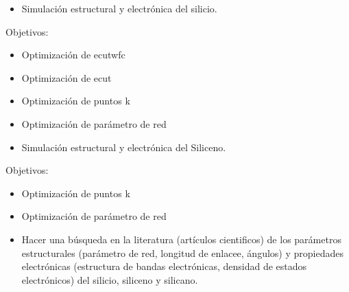 \begin{itemize}
    \item Simulación estructural y electrónica del silicio.
\end{itemize}

\vspace{0.5cm}

Objetivos:

\begin{itemize}
    \item Optimización de ecutwfc
    \item Optimización de ecut
    \item Optimización de puntos k
    \item Optimización de parámetro de red
\end{itemize}

\begin{itemize}
    \item Simulación estructural y electrónica del Siliceno.
\end{itemize}

\vspace{0.5cm}

Objetivos:

\begin{itemize}
    \item Optimización de puntos k
    \item Optimización de parámetro de red
\end{itemize}

\vspace{0.5cm}

\begin{itemize}
    \item Hacer una búsqueda en la literatura (artículos cientificos) de los parámetros 
          estructurales (parámetro de red, longitud de enlacee, ángulos) y propiedades
          electrónicas (estructura de bandas electrónicas, densidad de estados electrónicos)
          del silicio, siliceno y silicano.
\end{itemize}